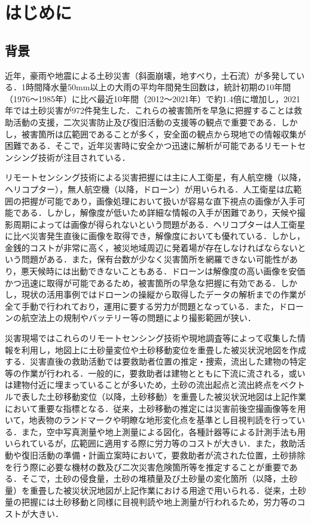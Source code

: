 \chapter{はじめに}
  \section{背景}
    近年，豪雨や地震による土砂災害（斜面崩壊，地すべり，土石流）が多発している．1時間降水量50mm以上の大雨の平均年間発生回数は，統計初期の10年間（1976〜1985年）に比べ最近10年間（2012〜2021年）で約1.4倍に増加し，2021年では土砂災害が972件発生した\cite{背景1, 背景2}．これらの被害箇所を早急に把握することは救助活動の支援，二次災害防止及び復旧活動の支援等の観点で重要である．しかし，被害箇所は広範囲であることが多く，安全面の観点から現地での情報収集が困難である\cite{背景3}．そこで，近年災害時に安全かつ迅速に解析が可能であるリモートセンシング技術が注目されている\cite{背景4}．

    リモートセンシング技術による災害把握には主に人工衛星，有人航空機（以降，ヘリコプター），無人航空機（以降，ドローン）が用いられる．人工衛星は広範囲の把握が可能であり，画像処理において扱いが容易な直下視点の画像が入手可能である．しかし，解像度が低いため詳細な情報の入手が困難であり，天候や撮影周期によっては画像が得られないという問題がある．ヘリコプターは人工衛星に比べ災害発生直後に画像を取得でき，解像度においても優れている．しかし，金銭的コストが非常に高く，被災地域周辺に発着場が存在しなければならないという問題がある．また，保有台数が少なく災害箇所を網羅できない可能性があり，悪天候時には出動できないこともある．ドローンは解像度の高い画像を安価かつ迅速に取得が可能であるため，被害箇所の早急な把握に有効である．しかし，現状の活用事例ではドローンの操縦から取得したデータの解析までの作業が全て手動で行われており，運用に要する労力が問題となっている．また，ドローンの航空法上の規制やバッテリー等の問題により撮影範囲が狭い\cite{背景5, 背景6, 背景7}．

    災害現場ではこれらのリモートセンシング技術や現地調査等によって収集した情報を利用し，地図上に土砂量変位や土砂移動変位を重畳した被災状況地図を作成する．災害直後の救助活動では要救助者位置の推定・捜索，流出した建物の特定等の作業が行われる．一般的に，要救助者は建物とともに下流に流される，或いは建物付近に埋まっていることが多いため，土砂の流出起点と流出終点をベクトルで表した土砂移動変位（以降，土砂移動）を重畳した被災状況地図は上記作業において重要な指標となる．従来，土砂移動の推定には災害前後空撮画像等を用いて，地表物のランドマークや明瞭な地形変化点を基準とし目視判読を行っている．また，空中写真測量や地上測量による図化，各種計器等による計測手法も用いられているが，広範囲に適用する際に労力等のコストが大きい\cite{土砂移動解析背景1, 土砂移動解析背景2}．また，救助活動や復旧活動の準備・計画立案時において，要救助者が流された位置，土砂排除を行う際に必要な機材の数及び二次災害危険箇所等を推定することが重要である．そこで，土砂の侵食量，土砂の堆積量及び土砂量の変化箇所（以降，土砂量）を重畳した被災状況地図が上記作業における用途で用いられる．従来，土砂量の把握には土砂移動と同様に目視判読や地上測量が行われるため，労力等のコストが大きい\cite{土砂量解析背景1, 土砂量解析背景2}．



